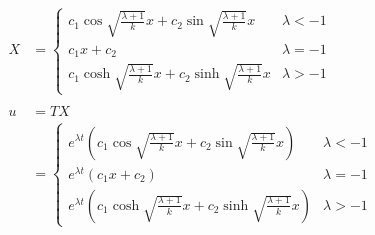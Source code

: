 \documentclass{article}
\begin{document}
\begin{align*}
  X                                       & = \begin{cases}
                                                c_1 \cos \sqrt{\frac{\lambda + 1}{k}} x + c_2 \sin \sqrt{\frac{\lambda + 1}{k}} x   & \lambda < -1 \\
                                                c_1 x + c_2                                                                         & \lambda = -1 \\
                                                c_1 \cosh \sqrt{\frac{\lambda + 1}{k}} x + c_2 \sinh \sqrt{\frac{\lambda + 1}{k}} x & \lambda > -1
                                              \end{cases}                                                                                                                                  \\ \\
  u                                       & = T X                                                                                                                                                                                                                                     \\
                                          & = \begin{cases}
                                                e^{\lambda t} \left( c_1 \cos \sqrt{\frac{\lambda + 1}{k}} x + c_2 \sin \sqrt{\frac{\lambda + 1}{k}} x \right)   & \lambda < -1 \\
                                                e^{\lambda t} \left( c_1 x + c_2 \right)                                                                         & \lambda = -1 \\
                                                e^{\lambda t} \left( c_1 \cosh \sqrt{\frac{\lambda + 1}{k}} x + c_2 \sinh \sqrt{\frac{\lambda + 1}{k}} x \right) & \lambda > -1
                                              \end{cases}
\end{align*}

\setcounter{subsubsection}{10}
\subsubsection{}
\end{document}
